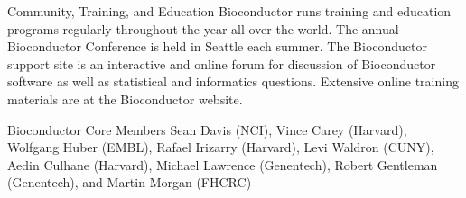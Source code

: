 \documentclass[final]{beamer}
\begin{document}
\begin{frame}[t]
\begin{columns}[t]
\begin{column}{0.24\linewidth}
\begin{block}{Community, Training, and Education}
\small{Bioconductor runs training and education programs regularly throughout the year all over the world.  The annual Bioconductor Conference is held in Seattle each summer.  The Bioconductor support site is an interactive and online forum for discussion of Bioconductor software as well as statistical and informatics questions. Extensive online training materials are at the Bioconductor website.}
      \end{block}
      \begin{block}{Bioconductor Core Members}
        \small{Sean Davis (NCI), Vince Carey (Harvard), Wolfgang Huber (EMBL), Rafael Irizarry (Harvard), Levi Waldron (CUNY), Aedin Culhane (Harvard), Michael Lawrence (Genentech), Robert Gentleman (Genentech), and Martin Morgan (FHCRC)}
      \end{block}
    \end{column}
    \end{columns}
  \end{frame}
\end{document}
